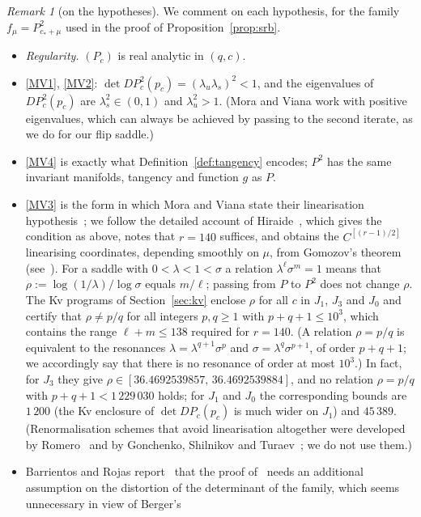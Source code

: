 \documentclass[11pt]{amsart}
\theoremstyle{definition}
\theoremstyle{remark}
\newtheorem{remark}[thm]{Remark}
\newcommand{\cs}{c_*}
\begin{document}
\begin{remark}[on the hypotheses]\label{rem:MVhyp}
We comment on each hypothesis, for the family $f_\mu=P^2_{\cs+\mu}$ used in the proof of
Proposition~\ref{prop:srb}.
\begin{itemize}[leftmargin=*]
\item \emph{Regularity.} $(P_c)$ is real analytic in $(q,c)$.
\item \ref{MV1}, \ref{MV2}: $\det DP^2_c(p_c)=(\lambda_u\lambda_s)^2<1$, and the eigenvalues of $DP^2_c(p_c)$ are
$\lambda_s^2\in(0,1)$ and $\lambda_u^2>1$. (Mora and Viana work with positive eigenvalues, which can always
be achieved by passing to the second iterate, as we do for our flip saddle.)
\item \ref{MV4} is exactly what Definition~\ref{def:tangency} encodes; $P^2$ has the same invariant manifolds,
tangency and function $g$ as $P$.
\item \ref{MV3} is the form in which Mora and Viana state their linearisation hypothesis~\cite[\S2]{MV93}; we
follow the detailed account of Hiraide~\cite[Theorem~2 and \S1]{Hir92}, which gives the condition as above, notes
that $r=140$ suffices, and obtains the $C^{[(r-1)/2]}$ linearising coordinates, depending smoothly on $\mu$, from
Gomozov's theorem (see~\cite{Bel78}). For a saddle with $0<\lambda<1<\sigma$ a relation $\lambda^\ell\sigma^m=1$ means
that $\rho:=\log(1/\lambda)/\log\sigma$ equals $m/\ell$; passing from $P$ to $P^2$ does not change $\rho$. The Kv
programs of Section~\ref{sec:kv} enclose $\rho$ for all $c$ in $J_1$, $J_3$ and $J_0$ and certify that $\rho\ne p/q$
for all integers $p,q\ge1$ with $p+q+1\le10^3$, which contains the range $\ell+m\le138$ required for $r=140$.
(A relation $\rho=p/q$ is equivalent to the resonances $\lambda=\lambda^{q+1}\sigma^p$ and $\sigma=\lambda^q\sigma^{p+1}$, of
order $p+q+1$; we accordingly say that there is no resonance of order at most $10^3$.) In
fact, for $J_3$ they give $\rho\in[36.4692539857,\,36.4692539884]$, and no relation $\rho=p/q$ with
$p+q+1<1\,229\,030$ holds; for $J_1$ and $J_0$ the corresponding bounds are $1\,200$ (the Kv enclosure of
$\det DP_c(p_c)$ is much wider on $J_1$) and $45\,389$. (Renormalisation schemes that avoid linearisation altogether
were developed by Romero~\cite{Romero95} and by Gonchenko, Shilnikov and Turaev~\cite{GST08}; we do not use them.)
\item Barrientos and Rojas report~\cite[footnote~2]{BR21} that the proof of~\cite{MV93} needs an additional
assumption on the distortion of the determinant of the family, which seems unnecessary in view of Berger's

\end{itemize}
\end{remark}
\end{document}
